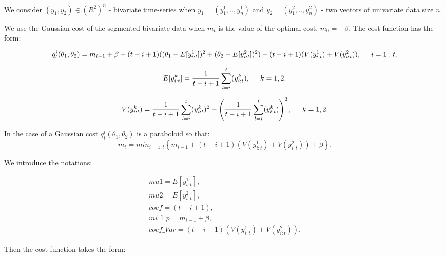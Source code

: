\documentclass{report}
\begin{document}
\newpage
	
	We consider $(y_1, y_2)\in(R^2)^n$ - bivariate time-series when $y_1 = (y_1^1,..,y_n^1)$ and  $y_2 = (y_1^2,..,y_n^2)$ - two vectors of univariate data size $n$.
	
	We use the Gaussian cost of the segmented bivariate data when $m_{t}$ is the value of the optimal cost, $m_{0} = -\beta $. The cost function has the form: 
	
	\begin{equation}
		q_t^i( \theta_1,\theta_2 ) = 	m_{i-1} + \beta + (t-i+1)(( \theta_1 - E[y^1_{i:t}])^2 + ( \theta_2 - E[y^2_{i:t}])^2) + (t-i+1)(V(y^1_{i:t}) + V(y^2_{i:t}) ) , \hspace*{5mm} i = 1:t.
	\label{eq:cost}
	\end{equation}
	
	\begin{equation}
		E[y_{i:t}^k] = \frac{1}{t - i + 1}\sum_{l=i}^{t}(y_{i:t}^k) ,\hspace*{5mm} k = 1,2.
	\label{eq:mean}
	\end{equation}
	
	\begin{equation}
		V(y_{i:t}^k) = \frac{1}{t - i + 1}\sum_{l=i}^{t}(y_{i:t}^k)^2 - \left(\frac{1}{t - i + 1}\sum_{l=i}^{t}(y_{i:t}^k)\right)^2 ,\hspace*{5mm} k = 1,2.
	\label{eq:var}
	\end{equation}
	
	In the case of a Gaussian cost $q_t^i(\theta_1,\theta_2)$ is a paraboloid so that: 
	\begin{equation}
		m_t = min_{i = 1:t} \left\{m_{i-1} + (t-i+1)(V(y_{i:t}^1) + V(y_{i:t}^2)) + \beta  \right\}.
	\label{eq:min}
	\end{equation}
	
	We introduce the notations:
	
	\begin{equation}
		\begin{gathered}
			mu1 = E[y_{i:t}^1],\\
			mu2 = E[y_{i:t}^2],\\
			coef = (t - i + 1),\\
			mi\_1\_p = m_{i-1} + \beta,\\
			coef\_Var = (t-i+1)(V(y_{i:t}^1) + V(y_{i:t}^2)).
		\end{gathered}
		\label{eq:coef}
	\end{equation}
	
	Then the cost function  takes the form:
	
\end{document}
